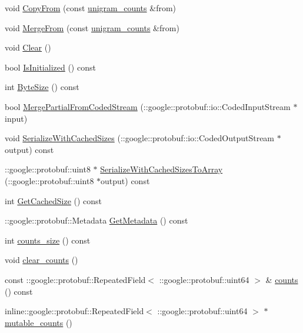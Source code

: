 \begin{DoxyCompactItemize}
\item 
void \hyperlink{class_l_d_a_1_1unigram__counts_af3391d5bf23dbcc110811b1881b760d7}{CopyFrom} (const \hyperlink{class_l_d_a_1_1unigram__counts}{unigram\_\-counts} \&from)
\item 
void \hyperlink{class_l_d_a_1_1unigram__counts_a254666bf8fa7ee639bd2843a87585f23}{MergeFrom} (const \hyperlink{class_l_d_a_1_1unigram__counts}{unigram\_\-counts} \&from)
\item 
void \hyperlink{class_l_d_a_1_1unigram__counts_a96c7cf4b1e555f9ac14667e9cd3165d4}{Clear} ()
\item 
bool \hyperlink{class_l_d_a_1_1unigram__counts_a44f18118e62e545c714c7d946f664a81}{IsInitialized} () const 
\item 
int \hyperlink{class_l_d_a_1_1unigram__counts_a19c31ef11c051203eeb433c5bcbc0d53}{ByteSize} () const 
\item 
bool \hyperlink{class_l_d_a_1_1unigram__counts_abaae2e29e04f31deb16bf83d4de032a5}{MergePartialFromCodedStream} (::google::protobuf::io::CodedInputStream $\ast$input)
\item 
void \hyperlink{class_l_d_a_1_1unigram__counts_a92764439a9a35a646fac3e79e4fd0af1}{SerializeWithCachedSizes} (::google::protobuf::io::CodedOutputStream $\ast$output) const 
\item 
::google::protobuf::uint8 $\ast$ \hyperlink{class_l_d_a_1_1unigram__counts_ac8d272e80dad410f689cd056790cf219}{SerializeWithCachedSizesToArray} (::google::protobuf::uint8 $\ast$output) const 
\item 
int \hyperlink{class_l_d_a_1_1unigram__counts_ae927e545f15c28e2f7046caa5c86f852}{GetCachedSize} () const 
\item 
::google::protobuf::Metadata \hyperlink{class_l_d_a_1_1unigram__counts_a4da33bdd12de90a6af4fa33e3482a721}{GetMetadata} () const 
\item 
int \hyperlink{class_l_d_a_1_1unigram__counts_ac97da7463b9dc3d5ed7c56f3542ebdc9}{counts\_\-size} () const 
\item 
void \hyperlink{class_l_d_a_1_1unigram__counts_aea0e31ae0324bd76fa8fbf115de61149}{clear\_\-counts} ()
\item 
const ::google::protobuf::RepeatedField$<$ ::google::protobuf::uint64 $>$ \& \hyperlink{class_l_d_a_1_1unigram__counts_a296cb84c517e9b258b9e5c38e18c8cca}{counts} () const 
\item 
inline::google::protobuf::RepeatedField$<$ ::google::protobuf::uint64 $>$ $\ast$ \hyperlink{class_l_d_a_1_1unigram__counts_a28ad79f31ea7a42f773e4346e75cc11b}{mutable\_\-counts} ()

\end{DoxyCompactItemize}
